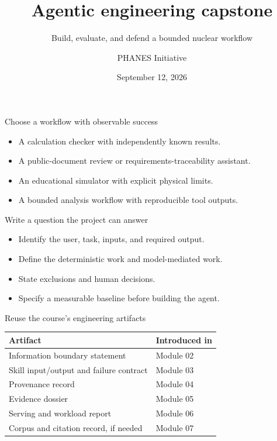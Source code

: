 \documentclass[aspectratio=169,11pt]{beamer}
\title{Agentic engineering capstone}
\subtitle{Build, evaluate, and defend a bounded nuclear workflow}
\author{PHANES Initiative}
\institute{The University of Texas at Austin}
\date{September 12, 2026}
\begin{document}
\begin{frame}[plain]
\titlepage
\end{frame}
\begin{frame}[t,fragile]{Choose a workflow with observable success}
\fontsize{11.5}{14}\selectfont
\begin{itemize}\setlength{\itemsep}{2mm}
\item A calculation checker with independently known results.
\item A public-document review or requirements-traceability assistant.
\item An educational simulator with explicit physical limits.
\item A bounded analysis workflow with reproducible tool outputs.
\end{itemize}
\end{frame}
\begin{frame}[t,fragile]{Write a question the project can answer}
\fontsize{11.5}{14}\selectfont
\begin{itemize}\setlength{\itemsep}{2mm}
\item Identify the user, task, inputs, and required output.
\item Define the deterministic work and model-mediated work.
\item State exclusions and human decisions.
\item Specify a measurable baseline before building the agent.
\end{itemize}
\end{frame}
\begin{frame}[t,fragile]{Reuse the course's engineering artifacts}
\fontsize{10.5}{12.5}\selectfont\setlength{\tabcolsep}{4pt}\renewcommand{\arraystretch}{1.15}
\begin{tabular}{>{\raggedright\arraybackslash}p{}>{\raggedright\arraybackslash}p{}}
\toprule
\textbf{Artifact} & \textbf{Introduced in} \\ \midrule
Information boundary statement & Module 02 \\[2pt]
Skill input/output and failure contract & Module 03 \\[2pt]
Provenance record & Module 04 \\[2pt]
Evidence dossier & Module 05 \\[2pt]
Serving and workload report & Module 06 \\[2pt]
Corpus and citation record, if needed & Module 07 \\[2pt]
\bottomrule\end{tabular}\par\vspace{2mm}
\end{frame}
\end{document}
